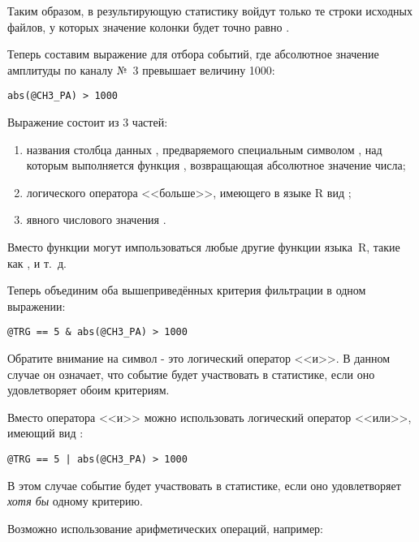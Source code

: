 Таким образом, в результирующую статистику войдут только те строки исходных файлов, у которых значение колонки  будет точно равно .

\bigskip

Теперь составим выражение для отбора событий, где абсолютное значение амплитуды по каналу №~3 превышает величину 1000:

\begin{lstlisting}
abs(@CH3_PA) > 1000
\end{lstlisting}

Выражение состоит из 3 частей:

\begin{enumerate}
\item названия столбца данных , предваряемого специальным символом , над которым выполняется функция , возвращающая абсолютное значение числа;
\item логического оператора <<больше>>, имеющего в языке R вид \CMDARG{>};
\item явного числового значения .
\end{enumerate}

Вместо функции  могут импользоваться любые другие функции языка~R, такие как ,  и т.~д.

\bigskip

Теперь объединим оба вышеприведённых критерия фильтрации в одном выражении:

\begin{lstlisting}
@TRG == 5 & abs(@CH3_PA) > 1000
\end{lstlisting}

Обратите внимание на символ \CMDARG{\&} - это логический оператор <<и>>. В данном случае он означает, что событие будет участвовать в статистике, если оно удовлетворяет обоим критериям.

Вместо оператора <<и>> можно использовать логический оператор <<или>>, имеющий вид \CMDARG{|}:

\begin{lstlisting}
@TRG == 5 | abs(@CH3_PA) > 1000
\end{lstlisting}

В этом случае событие будет участвовать в статистике, если оно удовлетворяет {\it хотя бы} одному критерию.

\bigskip

Возможно использование арифметических операций, например:


